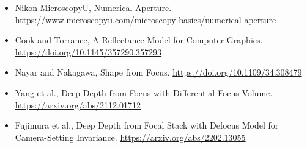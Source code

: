 \documentclass[11pt,a4paper]{ctexart}
\begin{document}
\begin{itemize}
\item Nikon MicroscopyU, Numerical Aperture. \url{https://www.microscopyu.com/microscopy-basics/numerical-aperture}
\item Cook and Torrance, A Reflectance Model for Computer Graphics. \url{https://doi.org/10.1145/357290.357293}
\item Nayar and Nakagawa, Shape from Focus. \url{https://doi.org/10.1109/34.308479}
\item Yang et al., Deep Depth from Focus with Differential Focus Volume. \url{https://arxiv.org/abs/2112.01712}
\item Fujimura et al., Deep Depth from Focal Stack with Defocus Model for Camera-Setting Invariance. \url{https://arxiv.org/abs/2202.13055}
\end{itemize}
\end{document}
